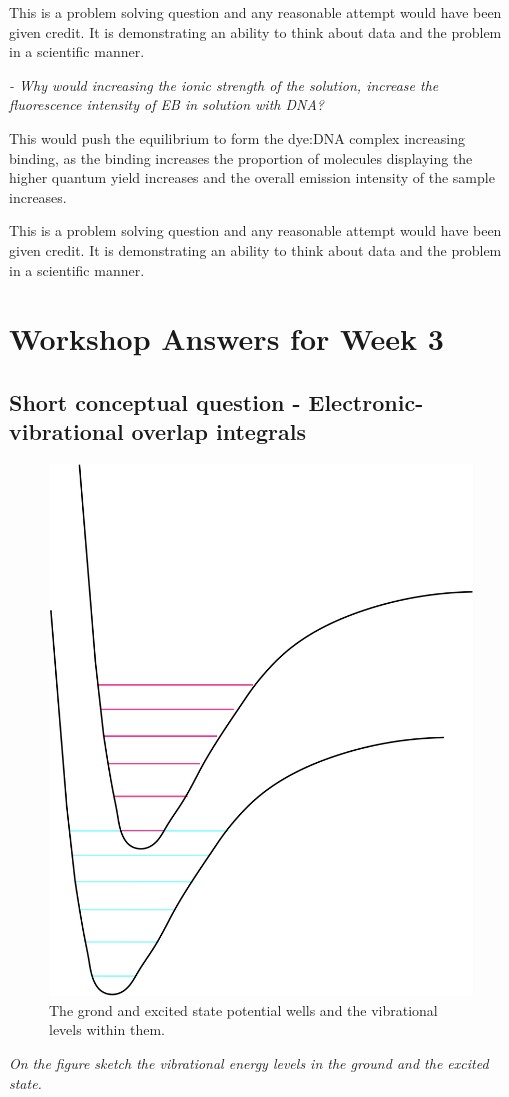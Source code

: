 \documentclass[
]{book}
\begin{document}
This is a problem solving question and any reasonable attempt would have been given credit. It is demonstrating an ability to think about data and the problem in a scientific manner.

\emph{- Why would increasing the ionic strength of the solution, increase the fluorescence intensity of EB in solution with DNA?}

This would push the equilibrium to form the dye:DNA complex increasing binding, as the binding increases the proportion of molecules displaying the higher quantum yield increases and the overall emission intensity of the sample increases.

This is a problem solving question and any reasonable attempt would have been given credit. It is demonstrating an ability to think about data and the problem in a scientific manner.

\hypertarget{ch:Workshop3}{%
\chapter{Workshop Answers for Week 3}\label{ch:Workshop3}}

\hypertarget{sec:overlap}{%
\section{Short conceptual question - Electronic-vibrational overlap integrals}\label{sec:overlap}}

\begin{figure}

{\centering \includegraphics[width=0.3\linewidth]{images/overlap} 

}

\caption{The grond and excited state potential wells and the vibrational levels within them.}\label{fig:overlap}
\end{figure}

\emph{On the figure sketch the vibrational energy levels in the ground and the excited state.}
\end{document}
